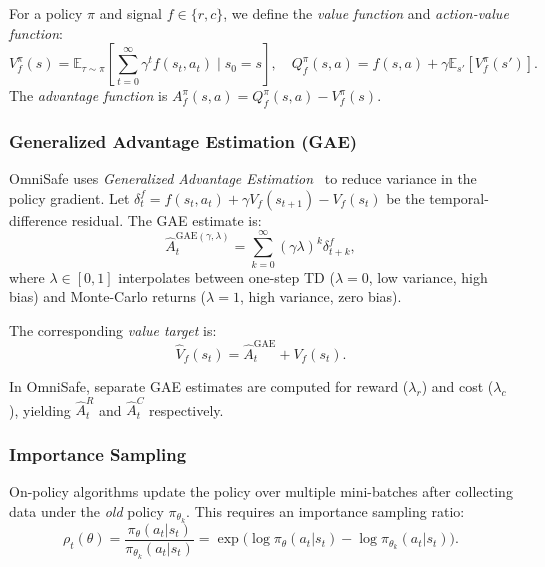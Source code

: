 \documentclass[12pt,a4paper]{article}
\theoremstyle{definition}
\newcommand{\E}{\mathbb{E}}
\newcommand{\piold}{\pi_{\theta_k}}
\begin{document}
For a policy $\pi$ and signal $f \in \{r, c\}$, we define the \emph{value function}
and \emph{action-value function}:
\begin{equation}
  V_f^\pi(s) = \E_{\tau \sim \pi}\!\left[\sum_{t=0}^{\infty}\gamma^t f(s_t,a_t)\;\Big|\;s_0=s\right],
  \quad
  Q_f^\pi(s,a) = f(s,a) + \gamma \E_{s'}[V_f^\pi(s')].
\end{equation}
The \emph{advantage function} is $A_f^\pi(s,a) = Q_f^\pi(s,a) - V_f^\pi(s)$.

\subsubsection{Generalized Advantage Estimation (GAE)}

OmniSafe uses \emph{Generalized Advantage Estimation}~\citep{schulman2015high} to reduce
variance in the policy gradient. Let $\delta_t^f = f(s_t,a_t) + \gamma V_f(s_{t+1}) - V_f(s_t)$
be the temporal-difference residual. The GAE estimate is:
\begin{equation}
  \label{eq:gae}
  \hat{A}_t^{\mathrm{GAE}(\gamma,\lambda)} = \sum_{k=0}^{\infty} (\gamma\lambda)^k \delta_{t+k}^f,
\end{equation}
where $\lambda \in [0,1]$ interpolates between one-step TD ($\lambda=0$, low variance, high
bias) and Monte-Carlo returns ($\lambda=1$, high variance, zero bias).

The corresponding \emph{value target} is:
\begin{equation}
  \hat{V}_f(s_t) = \hat{A}_t^{\mathrm{GAE}} + V_f(s_t).
\end{equation}

In OmniSafe, separate GAE estimates are computed for reward ($\lambda_r$) and cost ($\lambda_c$),
yielding $\hat{A}_t^R$ and $\hat{A}_t^C$ respectively.

\subsubsection{Importance Sampling}

On-policy algorithms update the policy over multiple mini-batches after collecting
data under the \emph{old} policy $\piold$. This requires an importance sampling ratio:
\begin{equation}
  \label{eq:is_ratio}
  \rho_t(\theta) = \frac{\pi_\theta(a_t|s_t)}{\piold(a_t|s_t)} = \exp\!\bigl(\log\pi_\theta(a_t|s_t) - \log\piold(a_t|s_t)\bigr).
\end{equation}
\end{document}
